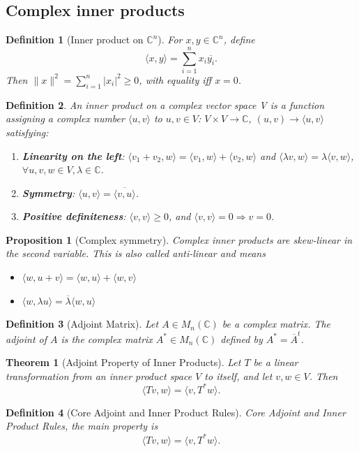 \documentclass{article}
\newtheorem{theorem}{Theorem}
\newtheorem{definition}{Definition}
\newtheorem{proposition}{Proposition}
\begin{document}
\subsection{Complex inner products}
\begin{definition}[Inner product on $\mathbb{C}^n$]
    For $x,y\in\mathbb{C}^n$, define
    \[\langle x,y\rangle = \sum_{i=1}^n x_i\overline{y_i}.\]
    Then $\|x\|^2 = \sum_{i=1}^n |x_i|^2 \geq 0$, with equality iff $x=0$.
\end{definition}
\begin{definition}
    An inner product on a complex vector space V is a function assigning a complex number $\langle u,v \rangle$ to $u,v \in V$: $V \times V \to \mathbb{C}$, $(u,v) \to \langle u,v\rangle$ satisfying:
    \begin{enumerate}
        \item \textbf{Linearity on the left}: $\langle v_1+v_2,w\rangle = \langle v_1,w\rangle + \langle v_2,w\rangle$ and $\langle\lambda v,w\rangle = \lambda\langle v,w\rangle$, $\forall u,v,w \in V, \lambda \in \mathbb{C}$.
        \item \textbf{Symmetry}: $\langle u,v\rangle = \overline{\langle v,u\rangle}$.
        \item \textbf{Positive definiteness}: $\langle v,v\rangle \ge 0$, and $\langle v,v\rangle = 0 \Rightarrow v=0$.
    \end{enumerate}
\end{definition}
\begin{proposition}[Complex symmetry]
    Complex inner products are skew-linear in the second variable. This is also called anti-linear and means
    \begin{itemize}
        \item $\langle w,u+v \rangle = \langle w,u \rangle + \langle w,v \rangle$
        \item $\langle w,\lambda u \rangle = \overline{\lambda}\langle w,u \rangle$
    \end{itemize}
\end{proposition}
\begin{definition}[Adjoint Matrix]
    Let $A \in M_{n}(\mathbb{C})$ be a complex matrix. The adjoint of $A$ is the complex matrix $A^* \in M_{n}(\mathbb{C})$ defined by $A^\ast = \overline{A}^t$.
\end{definition}
\begin{theorem}[Adjoint Property of Inner Products]
    Let $T$ be a linear transformation from an inner product space $V$ to itself, and let $v,w \in V$. Then
    \[\langle Tv,w\rangle = \langle v,T^\ast w\rangle.\]
\end{theorem}
\begin{definition}[Core Adjoint and Inner Product Rules]
    Core Adjoint and Inner Product Rules, the main property is
    \[\langle Tv,w \rangle = \langle v,T^\ast w \rangle.\]
\end{definition}
\end{document}
